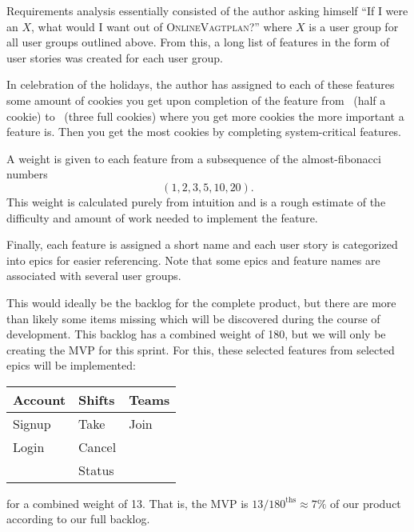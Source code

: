 \newlength{\cookieslen}
\newcommand{\cookiesvi}{\makebox[\width][l]{\faCookie\,\faCookie\,\faCookie}}
\settowidth{\cookieslen}{\cookiesvi}
\newcommand{\cookiesi}{\makebox[\cookieslen][l]{\faCookieBite}}
\newcommand{\cookiesii}{\makebox[\cookieslen][l]{\faCookie}}
\newcommand{\cookiesiii}{\makebox[\cookieslen][l]{\faCookie\,\faCookieBite}}
\newcommand{\cookiesiv}{\makebox[\cookieslen][l]{\faCookie\,\faCookie}}
\newcommand{\cookiesv}{\makebox[\cookieslen][l]{\faCookie\,\faCookie\,\faCookieBite}}

Requirements analysis essentially consisted of the author asking himself
``If I were an $X$, what would I want out of \textsc{OnlineVagtplan}?''
where $X$ is a user group for all user groups outlined above.
From this, a long list of features in the form of user stories was created for each user group.

In celebration of the holidays,
the author has assigned to each of these features
some amount of cookies you get upon completion of the feature
from \faCookieBite\ (half a cookie) to \cookiesvi\ (three full cookies)
where you get more cookies the more important a feature is.
Then you get the most cookies by completing system-critical features.

A weight is given to each feature
from a subsequence of the almost-fibonacci numbers \[(1, 2, 3, 5, 10, 20).\]
This weight is calculated purely from intuition
and is a rough estimate of the difficulty
and amount of work needed to implement the feature.

Finally, each feature is assigned a short name
and each user story is categorized into epics
for easier referencing.
Note that some epics and feature names are associated with several user groups.



This would ideally be the backlog for the complete product,
but there are more than likely some items missing
which will be discovered during the course of development.
This backlog has a combined weight of 180,
but we will only be creating the MVP for this sprint.
For this, these selected features from selected epics
will be implemented:
\begin{center}
	\begin{tabular}{lll}
		\textbf{Account} & \textbf{Shifts} & \textbf{Teams} \\
		\midrule
		Signup           & Take            & Join           \\
		Login            & Cancel          &                \\
		                 & Status
	\end{tabular}
\end{center}
for a combined weight of 13.
That is, the MVP is $13/180^{\mathrm{ths}} \approx 7\%$ of our product
according to our full backlog.

